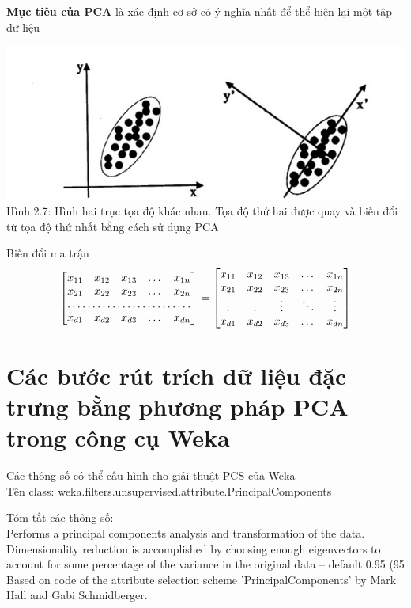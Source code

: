 \documentclass{hcmutarticle}
\begin{document}
\textbf{Mục tiêu của PCA } là xác định cơ sở có ý nghĩa nhất để thể hiện lại một tập dữ liệu

\begin{center}
	\includegraphics[scale=0.8]{image/figure.png}\\[0.5cm]
	Hình 2.7: Hình hai trục tọa độ khác nhau. Tọa độ thứ hai được quay và biến đổi từ tọa độ thứ nhất bằng cách sử dụng PCA
\end{center}
Biến đổi ma trận \\
\[
\begin{bmatrix}
x_{11}       & x_{12} & x_{13} & \dots & x_{1n} \\
x_{21}       & x_{22} & x_{23} & \dots & x_{2n} \\
\hdotsfor{5} \\
x_{d1}       & x_{d2} & x_{d3} & \dots & x_{dn}
\end{bmatrix}
=
\begin{bmatrix}
x_{11} & x_{12} & x_{13} & \dots  & x_{1n} \\
x_{21} & x_{22} & x_{23} & \dots  & x_{2n} \\
\vdots & \vdots & \vdots & \ddots & \vdots \\
x_{d1} & x_{d2} & x_{d3} & \dots  & x_{dn}
\end{bmatrix}
\]

\section{Các bước rút trích dữ liệu đặc trưng bằng phương pháp PCA trong công cụ Weka}

Các thông số có thể cấu hình cho giải thuật PCS của Weka \\

Tên class: weka.filters.unsupervised.attribute.PrincipalComponents

Tóm tắt các thông số: \\
Performs a principal components analysis and transformation of the data.
Dimensionality reduction is accomplished by choosing enough eigenvectors to account for some percentage of the variance in the original data -- default 0.95 (95%
Based on code of the attribute selection scheme 'PrincipalComponents' by Mark Hall and Gabi Schmidberger.
\end{document}
